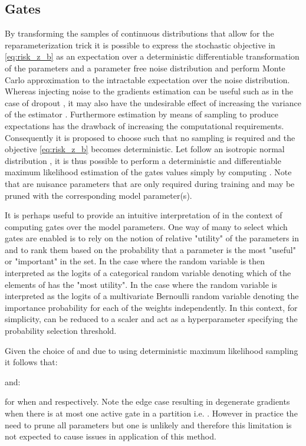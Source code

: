 \documentclass[final,1p,times]{elsarticle}
\begin{document}
\subsection{Gates}
\label{S:Gates}
By transforming the samples of continuous distributions that allow for the reparameterization trick \cite{Kingma2014, pmlr-v32-rezende14} it is possible to express the stochastic objective in \eqref{eq:risk_z_b} as an expectation over a deterministic differentiable transformation  of the parameters  and a parameter free noise distribution  and perform Monte Carlo approximation to the intractable expectation over the noise distribution. Whereas injecting noise to the gradients estimation can be useful such as in the case of dropout \cite{10.5555/2627435.2670313}, it may also have the undesirable effect of increasing the variance of the estimator \cite{Huang_2020_CVPR_Workshops}. Furthermore estimation by means of sampling to produce expectations has the drawback of increasing the computational requirements. Consequently it is proposed to choose  such that no sampling is required and the objective \eqref{eq:risk_z_b} becomes deterministic. Let  follow an isotropic normal distribution , it is thus possible to perform a deterministic and differentiable maximum likelihood estimation of the gates values simply by computing . Note that  are nuisance parameters that are only required during training and may be pruned with the corresponding model parameter(s).

It is perhaps useful to provide an intuitive interpretation of  in the context of computing gates over the model parameters. One way of many to select which gates are enabled is to rely on the notion of relative "utility" of the parameters in  and to rank them based on the probability that a parameter  is the most "useful" or "important" in the set. In the case where  the random variable  is then interpreted as the logits of a categorical random variable denoting which of the elements of  has the "most utility". In the case where  the random variable  is interpreted as the logits of a multivariate Bernoulli random variable denoting the importance probability for each of the weights independently. In this context, for simplicity,  can be reduced to a scaler and act as a hyperparameter specifying the probability selection threshold.

Given the choice of  and due to using deterministic maximum likelihood sampling it follows that:


and:


for when  and  respectively. Note the edge case resulting in degenerate gradients when there is at most one active gate in a partition i.e. . However in practice the need to prune all parameters but one is unlikely and therefore this limitation is not expected to cause issues in application of this method.
\end{document}
